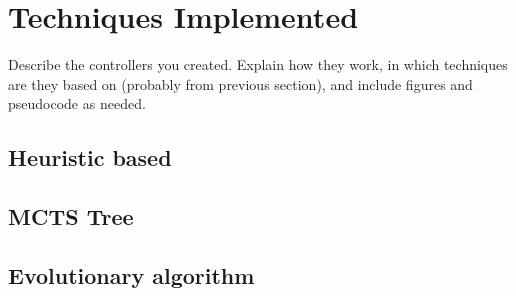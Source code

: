 \section{Techniques Implemented} \label{sec:exp}

Describe the controllers you created. Explain how they work, in which techniques are they based on (probably from previous section), and include figures and pseudocode as needed.



\subsection{Heuristic based} 
 


\subsection{MCTS Tree} 

\subsection{Evolutionary algorithm} 

